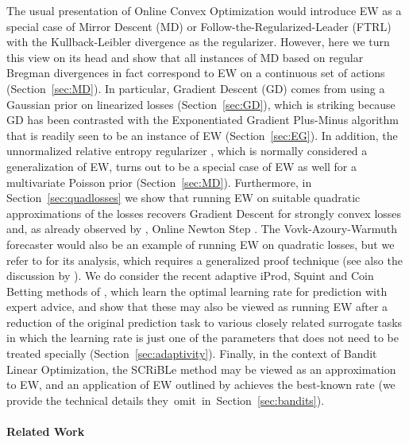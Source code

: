 \documentclass{colt2018} %
\begin{document}
The usual presentation of Online Convex Optimization would introduce EW
as a special case of Mirror Descent (MD) or Follow-the-Regularized-Leader
(FTRL) with the Kullback-Leibler divergence as the regularizer. However,
here we turn this view on its head
and show that all instances of MD based on regular Bregman
divergences \citep{banerjee2005} in fact
correspond to EW on a continuous set of actions (Section~\ref{sec:MD}). In particular, Gradient
Descent (GD) comes from using a Gaussian prior on linearized losses
(Section~\ref{sec:GD}), which is striking because GD has been contrasted
with the Exponentiated Gradient Plus-Minus algorithm
\citep{KivinenWarmuth} that is readily seen to be an instance of EW
(Section~\ref{sec:EG}). In addition, the unnormalized relative entropy
regularizer \citep{HelmboldWarmuth2009}, which is normally considered a
generalization of EW, turns out to be a special case of EW as well for
a multivariate Poisson prior (Section~\ref{sec:MD}). Furthermore, in
Section~\ref{sec:quadlosses} we show that running
EW on suitable quadratic approximations of the losses recovers Gradient Descent for strongly convex losses
\citep{HazanAgarwalKale2007} and, as already observed by
\citet{VanErvenKoolen2016}, Online Newton Step
\citep{HazanAgarwalKale2007}. The Vovk-Azoury-Warmuth forecaster would
also be an example of running EW on quadratic losses, but we refer to
\citep{Vovk2001} for its analysis, which requires a generalized proof
technique (see also the discussion by
\citet{OrabonaCrammerCesaBianchi}). We do consider the recent adaptive
iProd, Squint and Coin Betting methods of
\citet{KoolenVanErven2015,OrabonaPal2016}, which learn the optimal
learning rate for prediction with expert advice, and show that these may
also be viewed as running EW after a reduction of the original
prediction task to various closely related surrogate tasks in which the
learning rate is just one of the parameters that does not need to be
treated specially (Section~\ref{sec:adaptivity}). Finally, in the
context of Bandit Linear Optimization, the SCRiBLe method
\citep{abernethy2008} may be viewed as an approximation to EW, and an
application of EW outlined by \citet{bubeck2014} achieves the best-known
rate (we provide the technical details they~omit~in~Section~\ref{sec:bandits}).

\paragraph{Related Work}
\end{document}
